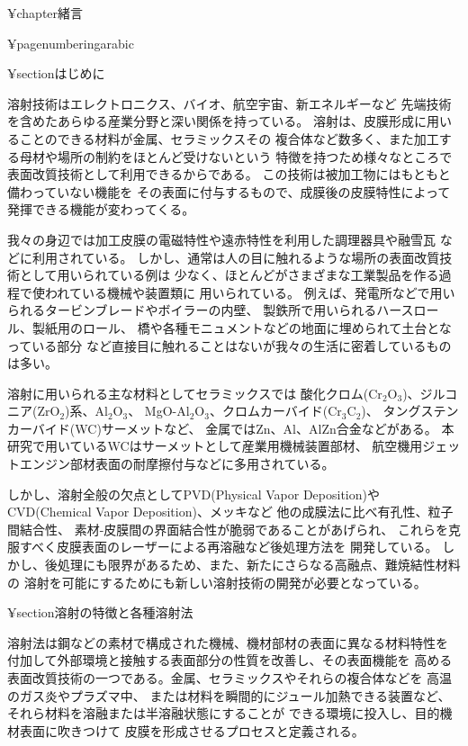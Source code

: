 
¥chapter{緒言}

¥pagenumbering{arabic} 

¥section{はじめに}


溶射技術はエレクトロニクス、バイオ、航空宇宙、新エネルギーなど
先端技術を含めたあらゆる産業分野と深い関係を持っている。
溶射は、皮膜形成に用いることのできる材料が金属、セラミックスその
複合体など数多く、また加工する母材や場所の制約をほとんど受けないという
特徴を持つため様々なところで表面改質技術として利用できるからである。
この技術は被加工物にはもともと備わっていない機能を
その表面に付与するもので、成膜後の皮膜特性によって
発揮できる機能が変わってくる。

我々の身辺では加工皮膜の電磁特性や遠赤特性を利用した調理器具や融雪瓦
などに利用されている。
しかし、通常は人の目に触れるような場所の表面改質技術として用いられている例は
少なく、ほとんどがさまざまな工業製品を作る過程で使われている機械や装置類に
用いられている。
例えば、発電所などで用いられるタービンブレードやボイラーの内壁、
製鉄所で用いられるハースロール、製紙用のロール、
橋や各種モニュメントなどの地面に埋められて土台となっている部分
など直接目に触れることはないが我々の生活に密着しているものは多い。

溶射に用いられる主な材料としてセラミックスでは
酸化クロム(Cr$_2$O$_3$)、ジルコニア(ZrO$_2$)系、Al$_2$O$_3$、
MgO-Al$_2$O$_3$、クロムカーバイド(Cr$_3$C$_2$)、
タングステンカーバイド(WC)サーメットなど、
金属ではZn、Al、AlZn合金などがある。
本研究で用いているWCはサーメットとして産業用機械装置部材、
航空機用ジェットエンジン部材表面の耐摩擦付与などに多用されている。

しかし、溶射全般の欠点としてPVD(Physical Vapor Deposition)や
CVD(Chemical Vapor Deposition)、メッキなど
他の成膜法に比べ有孔性、粒子間結合性、
素材-皮膜間の界面結合性が脆弱であることがあげられ、
これらを克服すべく皮膜表面のレーザーによる再溶融など後処理方法を
開発している。
しかし、後処理にも限界があるため、また、新たにさらなる高融点、難焼結性材料の
溶射を可能にするためにも新しい溶射技術の開発が必要となっている。

¥section{溶射の特徴と各種溶射法}

溶射法は鋼などの素材で構成された機械、機材部材の表面に異なる材料特性を
付加して外部環境と接触する表面部分の性質を改善し、その表面機能を
高める表面改質技術の一つである。金属、セラミックスやそれらの複合体などを
高温のガス炎やプラズマ中、
または材料を瞬間的にジュール加熱できる装置など、
それら材料を溶融または半溶融状態にすることが
できる環境に投入し、目的機材表面に吹きつけて
皮膜を形成させるプロセスと定義される。

